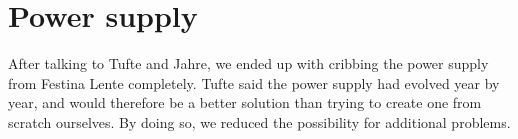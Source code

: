 \section {Power supply}

After talking to Tufte and Jahre, we ended up with cribbing the power supply
from Festina Lente completely. Tufte said the power supply had evolved year by
year, and would therefore be a better solution than trying to create one from
scratch ourselves. By doing so, we reduced the possibility for additional
problems.
